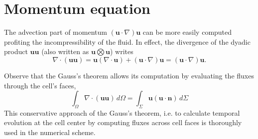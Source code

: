 \documentclass[a4paper]{report}
\begin{document}
\section{Momentum equation}
The advection part of momentum $(\mathbf{u} \cdot \nabla) \mathbf{u}$ can be more easily computed profiting the incompressibility of the fluid.  In effect, the divergence of the dyadic product $\mathbf{u}\mathbf{u}$ (also written as $\mathbf{u} \bigotimes \mathbf{u}$) writes
$$
\nabla \cdot(\mathbf{u}\mathbf{u}) = \mathbf{u} (\nabla \cdot \mathbf{u}) + (\mathbf{u} \cdot \nabla) \mathbf{u} = (\mathbf{u} \cdot \nabla) \mathbf{u}.
$$

Observe that the Gauss's theorem allows its computation by evaluating the fluxes through the cell's faces,
$$
\int_\Omega \nabla \cdot(\mathbf{u}\mathbf{u}) \, d\Omega = \int_\Sigma \mathbf{u}(\mathbf{u} \cdot \mathbf{n}) \, d\Sigma
$$
This conservative approach of the Gauss's theorem, i.e. to calculate temporal evolution at the cell center by computing fluxes across cell faces is thoroughly used in the numerical scheme.
\end{document}

